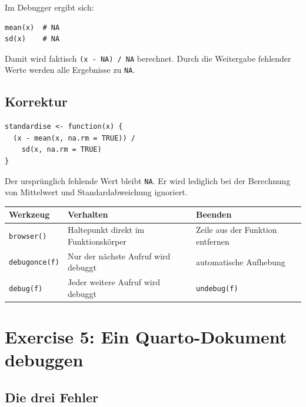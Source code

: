 \documentclass[11pt,a4paper]{ctexart}
\begin{document}
Im Debugger ergibt sich:

\begin{lstlisting}[style=rcode]
mean(x)  # NA
sd(x)    # NA
\end{lstlisting}

Damit wird faktisch \lstinline|(x - NA) / NA| berechnet. Durch die
Weitergabe fehlender Werte werden alle Ergebnisse zu \lstinline|NA|.

\subsection{Korrektur}

\begin{lstlisting}[style=rcode]
standardise <- function(x) {
  (x - mean(x, na.rm = TRUE)) /
    sd(x, na.rm = TRUE)
}
\end{lstlisting}

Der ursprünglich fehlende Wert bleibt \lstinline|NA|. Er wird lediglich bei
der Berechnung von Mittelwert und Standardabweichung ignoriert.

\begin{longtable}{p{}p{}p{}}
\toprule
Werkzeug & Verhalten & Beenden \\
\midrule
\endhead
\lstinline|browser()| & Haltepunkt direkt im Funktionskörper & Zeile aus der Funktion entfernen \\
\lstinline|debugonce(f)| & Nur der nächste Aufruf wird debuggt & automatische Aufhebung \\
\lstinline|debug(f)| & Jeder weitere Aufruf wird debuggt & \lstinline|undebug(f)| \\
\bottomrule
\end{longtable}

\section{Exercise 5: Ein Quarto-Dokument debuggen}

\subsection{Die drei Fehler}
\end{document}
